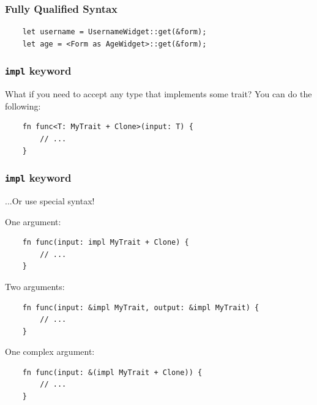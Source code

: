 \documentclass[aspectratio=1610,t]{beamer}
\begin{document}
\begin{frame}[fragile]
\frametitle{Fully Qualified Syntax}

\begin{verbatim}
    let username = UsernameWidget::get(&form);
    let age = <Form as AgeWidget>::get(&form);
\end{verbatim}


\end{frame}


\begin{frame}[fragile]
\frametitle{\texttt{impl} keyword}
What if you need to accept any type that implements some trait? You can do the following:

\begin{verbatim}
    fn func<T: MyTrait + Clone>(input: T) {
        // ...
    }
\end{verbatim}
\end{frame}


\begin{frame}[fragile]
\frametitle{\texttt{impl} keyword}
...Or use special syntax!

One argument:
\begin{verbatim}
    fn func(input: impl MyTrait + Clone) {
        // ...
    }
\end{verbatim}

Two arguments:
\begin{verbatim}
    fn func(input: &impl MyTrait, output: &impl MyTrait) {
        // ...
    }
\end{verbatim}

One complex argument:
\begin{verbatim}
    fn func(input: &(impl MyTrait + Clone)) {
        // ...
    }
\end{verbatim}

\end{frame}
\end{document}
